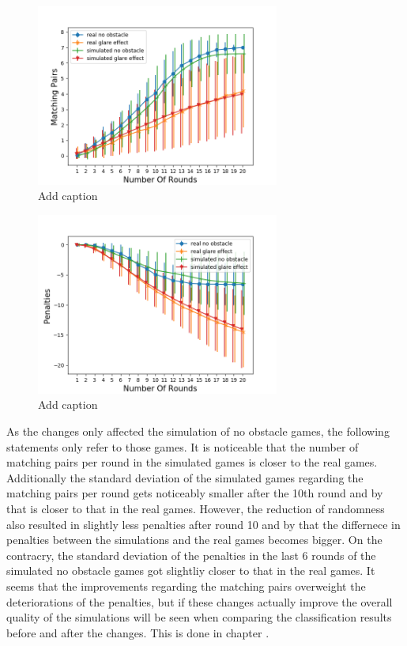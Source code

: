 \begin{minipage}{0.5\textwidth}
	\begin{figure}[H]
		\centering
		\includegraphics[width=8cm]{images/simulationOptimized1.png}
		\caption[Bild kurz]{Add caption}
		\label{fig:simOp1}
	\end{figure}
\end{minipage}
\begin{minipage}{0.5\textwidth}
	\begin{figure}[H]
		\centering
		\includegraphics[width=8cm]{images/simulationOptimized2.png}
		\caption[Bild kurz]{Add caption}
		\label{fig:simOp2}
	\end{figure}
\end{minipage} 

As the changes only affected the simulation of no obstacle games, the following statements only refer to those games. It is noticeable that the number of matching pairs per round in the simulated games is closer to the real games. Additionally the standard deviation of the simulated games regarding the matching pairs per round gets noticeably smaller after the 10th round and by that is closer to that in the real games. However, the reduction of randomness also resulted in slightly less penalties after round 10 and by that the differnece in penalties between the simulations and the real games becomes bigger. On the contracry, the standard deviation of the penalties in the last 6 rounds of the simulated no obstacle games got slightliy closer to that in the real games. It seems that the improvements regarding the matching pairs overweight the deteriorations of the penalties, but if these changes actually improve the overall quality of the simulations will be seen when comparing the classification results before and after the changes. This is done in chapter . 

